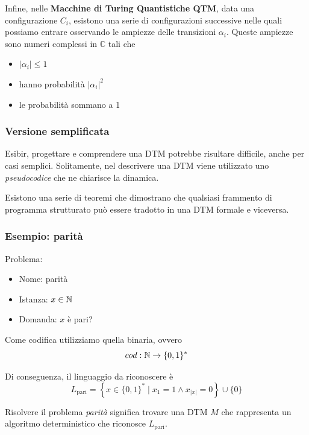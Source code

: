 Infine, nelle \textbf{Macchine di Turing Quantistiche QTM}, data una configurazione $C_i$, esistono una serie di configurazioni successive nelle quali possiamo entrare osservando le ampiezze delle transizioni $\alpha_i$. Queste ampiezze sono numeri complessi in $\mathbb{C}$ tali che
\begin{itemize}
	\item $|\alpha_i| \leq 1$
	\item hanno probabilità $|\alpha_i|^2$
	\item le probabilità sommano a 1
\end{itemize}

\subsubsection{Versione semplificata}
Esibir, progettare e comprendere una DTM potrebbe risultare difficile, anche per casi semplici. Solitamente, nel descrivere una DTM viene utilizzato uno \textit{pseudocodice} che ne chiarisce la dinamica.

Esistono una serie di teoremi che dimostrano che qualsiasi frammento di programma strutturato può essere tradotto in una DTM formale e viceversa.\\

\subsubsection{Esempio: parità}
Problema: 
\begin{itemize}
	\item Nome: parità
	\item Istanza: $x \in \mathbb{N}$
	\item Domanda: $x$ è pari?
\end{itemize}

Come codifica utilizziamo quella binaria, ovvero
$$ cod: \mathbb{N} \rightarrow \{0,1\}^\ast $$

Di conseguenza, il linguaggio da riconoscere è 
$$ L_{\text{pari}} = \left\{x \in \{0,1\}^\ast \mid x_1 = 1 \wedge x_{|x|} = 0 \right\} \cup \{0\} $$

Risolvere il problema \textit{parità} significa trovare una DTM $M$ che rappresenta un algoritmo deterministico che riconosce $L_{\text{pari}}$. \\

